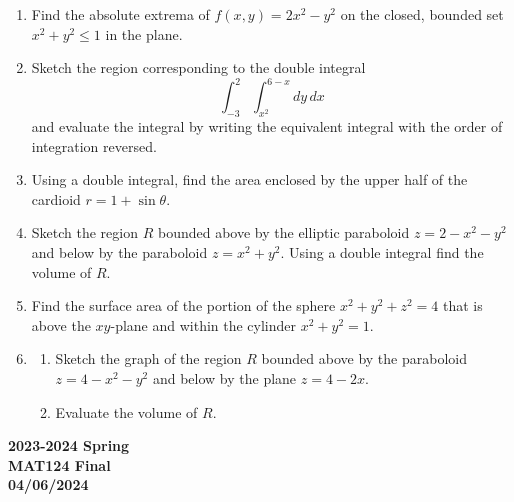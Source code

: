 \documentclass[a4paper, 12pt]{article}
\begin{document}
\begin{enumerate}[leftmargin=*,label=\textbf{\arabic*.}]
\item Find the absolute extrema of $f(x,y) = 2x^2-y^2$ on the closed, bounded set $x^2+y^2\leq1$ in the plane.

\item Sketch the region corresponding to the double integral
\[\int_{-3}^2\int_{x^2}^{6-x}dy\,dx\]
and evaluate the integral by writing the equivalent integral with the order of integration reversed.

\item Using a double integral, find the area enclosed by the upper half of the cardioid $r=1+\sin\theta$.

\item Sketch the region $R$ bounded above by the elliptic paraboloid $z=2-x^2-y^2$ and below by the paraboloid $z=x^2+y^2$. Using a double integral find the volume of $R$.

\item Find the surface area of the portion of the sphere $x^2+y^2+z^2=4$ that is above the $xy$-plane and within the cylinder $x^2+y^2=1$.

\item \begin{enumerate}[leftmargin=*,label=\textbf{\alph*.}]
\item Sketch the graph of the region $R$ bounded above by the paraboloid $z=4-x^2-y^2$ and below by the plane $z=4-2x$.

\item Evaluate the volume of $R$.
\end{enumerate}
\end{enumerate}
\newpage
{}
{}
\begin{center}
\textbf{2023-2024 Spring \\MAT124 Final\\04/06/2024}
\end{center}
\end{document}
